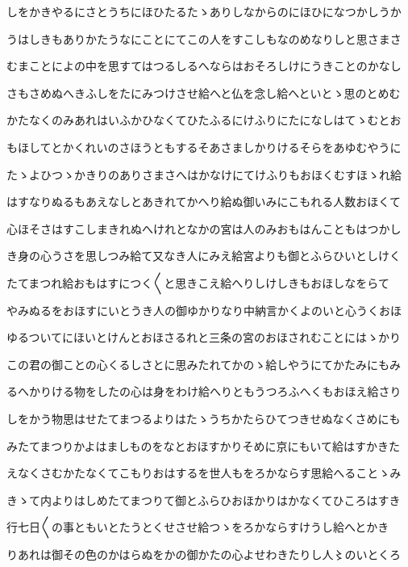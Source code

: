 \documentclass[a4paper,11pt,landscape]{ltjtarticle}
\begin{document}
\par\medskip
しをかきやるにさとうちにほひたるたゝありしなからのにほひになつかしうか
\par\medskip
うはしきもありかたうなにことにてこの人をすこしもなのめなりしと思さまさ
\par\medskip
むまことによの中を思すてはつるしるへならはおそろしけにうきことのかなし
\par\medskip
さもさめぬへきふしをたにみつけさせ給へと仏を念し給へといとゝ思のとめむ
\par\medskip
かたなくのみあれはいふかひなくてひたふるにけふりにたになしはてゝむとお
\par\medskip
もほしてとかくれいのさほうともするそあさましかりけるそらをあゆむやうに
\par\medskip
たゝよひつゝかきりのありさまさへはかなけにてけふりもおほくむすほゝれ給
\par\medskip
はすなりぬるもあえなしとあきれてかへり給ぬ御いみにこもれる人数おほくて
\par\medskip
心ほそさはすこしまきれぬへけれとなかの宮は人のみおもはんこともはつかし
\par\medskip
き身の心うさを思しつみ給て又なき人にみえ給宮よりも御とふらひいとしけく
\par\medskip
たてまつれ給おもはすにつく〱と思きこえ給へりしけしきもおほしなをらて
\par\medskip
やみぬるをおほすにいとうき人の御ゆかりなり中納言かくよのいと心うくおほ
\par\medskip
ゆるついてにほいとけんとおほさるれと三条の宮のおほされむことにはゝかり
\par\medskip
この君の御ことの心くるしさとに思みたれてかのゝ給しやうにてかたみにもみ
\par\medskip
るへかりける物をしたの心は身をわけ給へりともうつろふへくもおほえ給さり
\par\medskip
しをかう物思はせたてまつるよりはたゝうちかたらひてつきせぬなくさめにも
\par\medskip
みたてまつりかよはましものをなとおほすかりそめに京にもいて給はすかきた
\par\medskip
えなくさむかたなくてこもりおはするを世人もをろかならす思給へることゝみ
\par\medskip
きゝて内よりはしめたてまつりて御とふらひおほかりはかなくてひころはすき
\par\medskip
行七日〱の事ともいとたうとくせさせ給つゝをろかならすけうし給へとかき
\par\medskip
りあれは御その色のかはらぬをかの御かたの心よせわきたりし人〻のいとくろ
\end{document}
